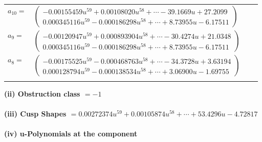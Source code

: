 \documentclass[1p]{elsarticle_modified}
\theoremstyle{definition}
\begin{document}
\begin{tabular}{m{7pt} m{180pt} m{7pt} m{180pt} }
\flushright $a_{10}=$&$\begin{pmatrix}-0.00155459 u^{59}+0.00108020 u^{58}+\cdots-39.1669 u+27.2099\\0.000345116 u^{59}-0.000186298 u^{58}+\cdots+8.73955 u-6.17511\end{pmatrix}$ \\
\flushright $a_{9}=$&$\begin{pmatrix}-0.00120947 u^{59}+0.000893904 u^{58}+\cdots-30.4274 u+21.0348\\0.000345116 u^{59}-0.000186298 u^{58}+\cdots+8.73955 u-6.17511\end{pmatrix}$ \\
\flushright $a_{8}=$&$\begin{pmatrix}-0.00175525 u^{59}-0.000468763 u^{58}+\cdots-34.3728 u+3.63194\\0.000128794 u^{59}-0.000138534 u^{58}+\cdots+3.06900 u-1.69755\end{pmatrix}$\\&\end{tabular}
\flushleft \textbf{(ii) Obstruction class $= -1$}\\~\\
\flushleft \textbf{(iii) Cusp Shapes $= 0.00272374 u^{59}+0.00105874 u^{58}+\cdots+53.4296 u-4.72817$}\\~\\
\newpage\renewcommand{\arraystretch}{1}
\flushleft \textbf{(iv) u-Polynomials at the component}\newline \\
\end{document}
